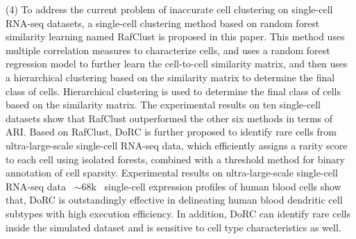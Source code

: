 \begin{abstracten}
(4) To address the current problem of inaccurate cell clustering on single-cell RNA-seq datasets, 
a single-cell clustering method based on random forest similarity learning named RafClust is proposed in this paper.  
This method uses multiple correlation measures to characterize cells, and uses a random forest regression model to further learn the cell-to-cell similarity matrix, and then uses a hierarchical clustering based on the similarity matrix to determine the final class of cells. 
Hierarchical clustering is used to determine the final class of cells based on the similarity matrix. 
The experimental results on ten single-cell datasets show that RafClust outperformed the other six methods in terms of ARI. 
Based on RafClust, DoRC is further proposed to identify rare cells from ultra-large-scale single-cell RNA-seq data, 
which efficiently assigns a rarity score to each cell using isolated forests, combined with a threshold method for binary annotation of cell sparsity. 
Experimental results on ultra-large-scale single-cell RNA-seq data ~${\sim}68$k~ single-cell expression profiles of human blood cells show that,
DoRC is outstandingly effective in delineating human blood dendritic cell subtypes with high execution efficiency. 
In addition, DoRC can identify rare cells inside the simulated dataset and is sensitive to cell type characteristics as well.


\end{abstracten}